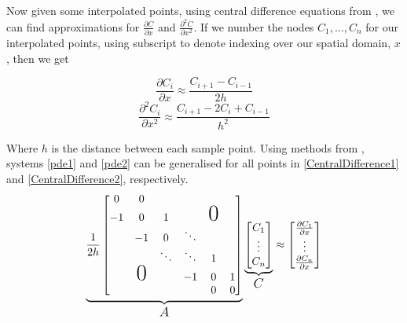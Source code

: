 \documentclass{article}
\begin{document}
Now given some interpolated points, using central difference equations from \cite{numanal}, we can find approximations for $\frac{\partial C}{\partial x}$ and $\frac{\partial^2 C}{\partial x^2}$. If we number the nodes $C_1, \ldots , C_n$ for our interpolated points, using subscript to denote indexing over our spatial domain, $x$, then we get

\begin{equation} \label{pde1}
    \frac{\partial C_i}{\partial x} \approx \frac{C_{i+1} - C_{i-1}}{2h}
\end{equation}
\begin{equation} \label{pde2}
    \frac{\partial^2 C_i}{\partial x^2} \approx \frac{C_{i+1} -2C_i + C_{i-1}}{h^2}
\end{equation}

Where $h$ is the distance between each sample point. Using methods from \cite{differential}, systems \eqref{pde1} and \eqref{pde2} can be generalised for all points in \eqref{CentralDifference1} and \eqref{CentralDifference2}, respectively.
\begin{equation} \label{CentralDifference1}
        \underbrace{\frac{1}{2h}
        \begin{bmatrix}
        0 & 0 &  & & \\
        -1 & 0 & 1 & &\text{\huge{$0$}} & \\
         & -1 & 0 & \ddots &\\
         & & \ddots & \ddots & 1 \\
         & \text{\huge{$0$}} & & -1 & 0 & 1 \\
         & & & & 0 & 0
        \end{bmatrix}}_\text{\large{$A$}}
        \underbrace{\begin{bmatrix}
            C_1 \\ \vdots \\ C_n
        \end{bmatrix}}_\text{\large{$C$}}
        \approx
        \begin{bmatrix}
            \frac{\partial C_1}{\partial x} \\ \vdots \\ \frac{\partial C_n}{\partial x}
        \end{bmatrix}
\end{equation}
\end{document}
